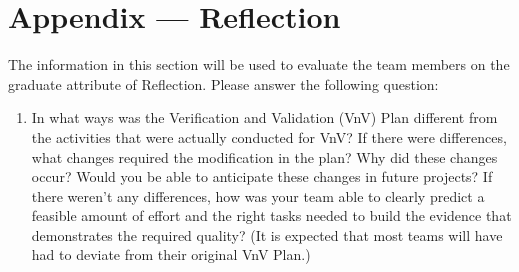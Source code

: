 \documentclass[12pt, titlepage]{article}
\begin{document}



\newpage{}
\section*{Appendix --- Reflection}

The information in this section will be used to evaluate the team members on the
graduate attribute of Reflection.  Please answer the following question:

\begin{enumerate}
  \item In what ways was the Verification and Validation (VnV) Plan different
  from the activities that were actually conducted for VnV?  If there were
  differences, what changes required the modification in the plan?  Why did
  these changes occur?  Would you be able to anticipate these changes in future
  projects?  If there weren't any differences, how was your team able to clearly
  predict a feasible amount of effort and the right tasks needed to build the
  evidence that demonstrates the required quality?  (It is expected that most
  teams will have had to deviate from their original VnV Plan.)
\end{enumerate}
\end{document}
